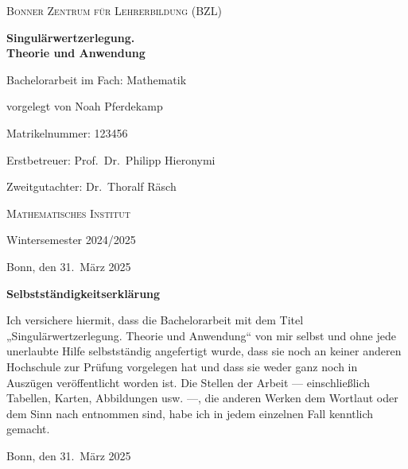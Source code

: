\begin{titlepage}
    \centering

    
    {\LARGE\textsc{ Bonner Zentrum für Lehrerbildung (BZL)}}\par\vspace{5cm}

    
    {\Huge\bfseries Singulärwertzerlegung.\\Theorie und Anwendung}\par\vspace{1.5cm}

    
    {\fontsize{17pt}{21pt}\selectfont Bachelorarbeit im Fach: Mathematik}\par\vspace{1cm}

    
    {\Large vorgelegt von Noah Pferdekamp}\par\vspace{2pt}
    {\large Matrikelnummer: 123456}\par\vspace{1cm}

    
    {\large Erstbetreuer: Prof.\ Dr.\ Philipp Hieronymi}\par\vspace{2pt}
    {\large Zweitgutachter: Dr.\ Thoralf Räsch}\par\vspace{2pt}
    {\large\textsc{Mathematisches Institut}\par\vspace{1cm}}

    
    {\large Wintersemester 2024/2025}\par\vspace{2pt}
    {\large Bonn, den 31.\ März 2025}\par

    
\end{titlepage}
\thispagestyle{empty}
\noindent\textbf{Selbstständigkeitserklärung}
\vspace{1em}


\noindent Ich versichere hiermit, dass die Bachelorarbeit mit dem Titel „Singulärwertzerlegung. Theorie und Anwendung“ von mir selbst und ohne jede unerlaubte Hilfe selbstständig angefertigt wurde, dass sie noch an keiner anderen Hochschule zur Prüfung vorgelegen hat und dass sie weder ganz noch in Auszügen veröffentlicht worden ist. Die Stellen der Arbeit ---  einschließlich Tabellen, Karten, Abbildungen usw. ---, die anderen Werken dem Wortlaut oder dem Sinn nach entnommen sind, habe ich in jedem einzelnen Fall kenntlich gemacht. 
\vspace{1em}

\vspace{-9pt}
\noindent Bonn, den 31.\ März 2025




